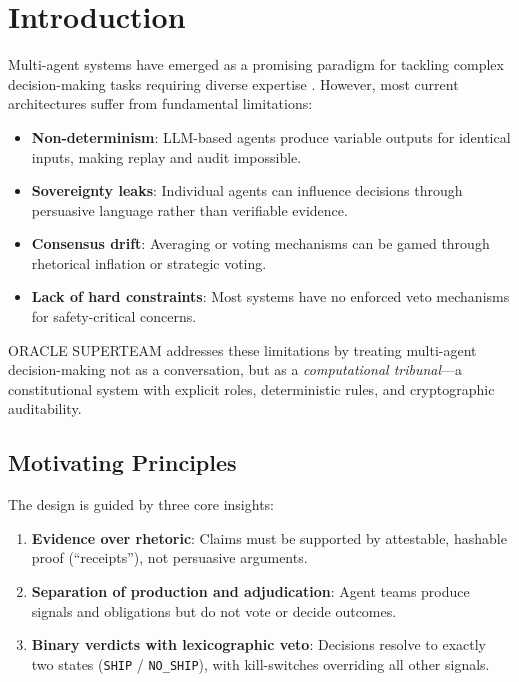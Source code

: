 \documentclass[11pt, letterpaper]{article}
\begin{document}
\section{Introduction}

Multi-agent systems have emerged as a promising paradigm for tackling complex decision-making tasks requiring diverse expertise \cite{autogen, chatdev, metagpt}. However, most current architectures suffer from fundamental limitations:

\begin{itemize}[leftmargin=*]
    \item \textbf{Non-determinism}: LLM-based agents produce variable outputs for identical inputs, making replay and audit impossible.
    \item \textbf{Sovereignty leaks}: Individual agents can influence decisions through persuasive language rather than verifiable evidence.
    \item \textbf{Consensus drift}: Averaging or voting mechanisms can be gamed through rhetorical inflation or strategic voting.
    \item \textbf{Lack of hard constraints}: Most systems have no enforced veto mechanisms for safety-critical concerns.
\end{itemize}

ORACLE SUPERTEAM addresses these limitations by treating multi-agent decision-making not as a conversation, but as a \textit{computational tribunal}—a constitutional system with explicit roles, deterministic rules, and cryptographic auditability.

\subsection{Motivating Principles}

The design is guided by three core insights:

\begin{enumerate}
    \item \textbf{Evidence over rhetoric}: Claims must be supported by attestable, hashable proof (``receipts''), not persuasive arguments.
    \item \textbf{Separation of production and adjudication}: Agent teams produce signals and obligations but do not vote or decide outcomes.
    \item \textbf{Binary verdicts with lexicographic veto}: Decisions resolve to exactly two states (\texttt{SHIP} / \texttt{NO\_SHIP}), with kill-switches overriding all other signals.
\end{enumerate}
\end{document}

